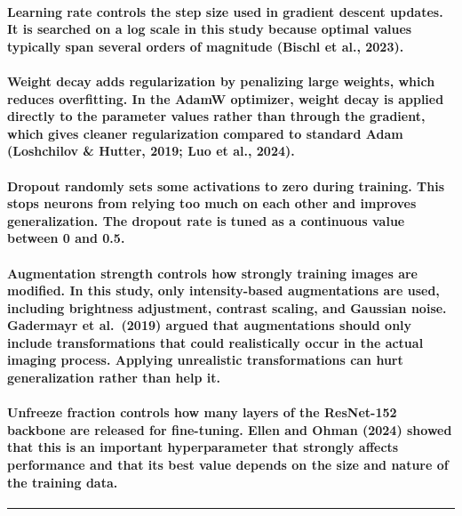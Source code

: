 \paragraph{Learning rate controls the step size used in gradient descent updates. It is searched on a log scale in this study because optimal values typically span several orders of magnitude (Bischl et al., 2023).}

\paragraph{Weight decay adds regularization by penalizing large weights, which reduces overfitting. In the AdamW optimizer, weight decay is applied directly to the parameter values rather than through the gradient, which gives cleaner regularization compared to standard Adam (Loshchilov \& Hutter, 2019; Luo et al., 2024).}

\paragraph{Dropout randomly sets some activations to zero during training. This stops neurons from relying too much on each other and improves generalization. The dropout rate is tuned as a continuous value between 0 and 0.5.}

\paragraph{Augmentation strength controls how strongly training images are modified. In this study, only intensity-based augmentations are used, including brightness adjustment, contrast scaling, and Gaussian noise. Gadermayr et al. (2019) argued that augmentations should only include transformations that could realistically occur in the actual imaging process. Applying unrealistic transformations can hurt generalization rather than help it.}

\paragraph{Unfreeze fraction controls how many layers of the ResNet-152 backbone are released for fine-tuning. Ellen and Ohman (2024) showed that this is an important hyperparameter that strongly affects performance and that its best value depends on the size and nature of the training data.}

\begin{center}\rule{0.5\linewidth}{0.5pt}\end{center}

